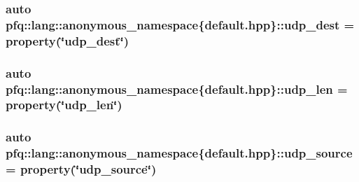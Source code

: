 \hypertarget{namespacepfq_1_1lang_1_1anonymous__namespace_02default_8hpp_03_a7c15d9ec0af24b9515acc8a04b7b1e2e}{
\subsubsection[{udp\+\_\+dest}]{\setlength{\rightskip}{0pt plus 5cm}auto pfq\+::lang\+::anonymous\+\_\+namespace\{default.\+hpp\}\+::udp\+\_\+dest = {\bf property}(\char`\"{}udp\+\_\+dest\char`\"{})}}\label{namespacepfq_1_1lang_1_1anonymous__namespace_02default_8hpp_03_a7c15d9ec0af24b9515acc8a04b7b1e2e}
\hypertarget{namespacepfq_1_1lang_1_1anonymous__namespace_02default_8hpp_03_ac7f1ef80a8ec46ce01aa12f66cfee86b}{
\subsubsection[{udp\+\_\+len}]{\setlength{\rightskip}{0pt plus 5cm}auto pfq\+::lang\+::anonymous\+\_\+namespace\{default.\+hpp\}\+::udp\+\_\+len = {\bf property}(\char`\"{}udp\+\_\+len\char`\"{})}}\label{namespacepfq_1_1lang_1_1anonymous__namespace_02default_8hpp_03_ac7f1ef80a8ec46ce01aa12f66cfee86b}
\hypertarget{namespacepfq_1_1lang_1_1anonymous__namespace_02default_8hpp_03_ab44590359ef60febe9bfc6465bcf932a}{
\subsubsection[{udp\+\_\+source}]{\setlength{\rightskip}{0pt plus 5cm}auto pfq\+::lang\+::anonymous\+\_\+namespace\{default.\+hpp\}\+::udp\+\_\+source = {\bf property}(\char`\"{}udp\+\_\+source\char`\"{})}}\label{namespacepfq_1_1lang_1_1anonymous__namespace_02default_8hpp_03_ab44590359ef60febe9bfc6465bcf932a}

